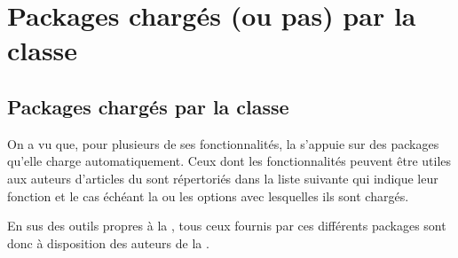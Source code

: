 \documentclass[english,nolocaltoc]{nwejmart}
\newtheorem[style=definition]{fait}
\newtheorem[title=expérience]{experience}
\newtheorem[title-plural=anneaux]{anneau}
\newtheorem[title=idéal,title-plural=idéaux]{ideal}
\begin{document}
\section{Packages chargés (ou pas) par la
  classe}\label{sec-packages-charges-ou-pas}

\subsection{Packages chargés par la classe}\label{sec:packages-charges-par}

On a vu que, pour plusieurs de ses fonctionnalités, la \nwejmauthorcl{} s'appuie
sur des packages qu'elle charge automatiquement. Ceux dont les fonctionnalités
peuvent être utiles aux auteurs d'articles du \nwejm{} sont répertoriés dans la
liste suivante qui indique leur fonction et le cas échéant la ou les options
avec lesquelles ils sont chargés.

En sus des outils propres à la \nwejmauthorcl, tous ceux fournis par ces
différents packages sont donc à disposition des auteurs de la \nwejm{}.
\end{document}
